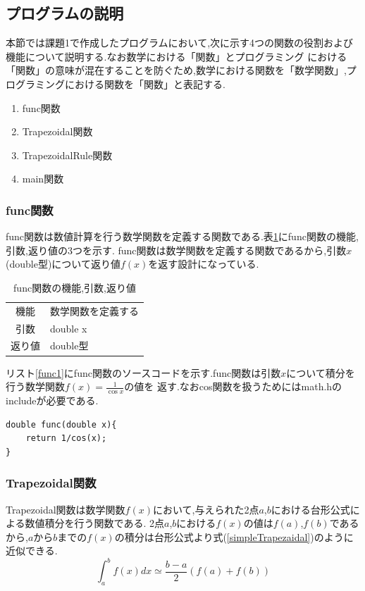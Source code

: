\documentclass[dvipdfmx]{jarticle}
\begin{document}
    \subsection{プログラムの説明}
    本節では課題1で作成したプログラムにおいて,次に示す4つの関数の役割および機能について説明する.なお数学における「関数」とプログラミング
    における「関数」の意味が混在することを防ぐため,数学における関数を「数学関数」,プログラミングにおける関数を「関数」と表記する.
    \begin{enumerate}
      \item func関数
      \item Trapezoidal関数
      \item TrapezoidalRule関数
      \item main関数
      \end{enumerate}
    
    \subsubsection{func関数}
    func関数は数値計算を行う数学関数を定義する関数である.表\ref{func1table}にfunc関数の機能,引数,返り値の3つを示す.
    func関数は数学関数を定義する関数であるから,引数$x$(double型)について返り値$f(x)$を返す設計になっている.
      \begin{table}[H]
      \caption{func関数の機能,引数,返り値}
      \label{func1table}
      \begin{center}
          \begin{tabular}{c|l}\hline
        機能 & 数学関数を定義する\\
        引数 & double x \\
        返り値 & double型 \\ \hline
          \end{tabular}
      \end{center}
      \end{table}

    リスト\ref{func1}にfunc関数のソースコードを示す.func関数は引数$x$について積分を行う数学関数$f(x) = \frac{1}{\cos x}$の値を
    返す.なおcos関数を扱うためにはmath.hのincludeが必要である.
    \begin{lstlisting}[basicstyle=\ttfamily\footnotesize, frame=single,label=func1,caption=func関数]
double func(double x){
    return 1/cos(x);
} 
    \end{lstlisting}

    \subsubsection{Trapezoidal関数}
    Trapezoidal関数は数学関数$f(x)$において,与えられた2点$a$,$b$における台形公式による数値積分を行う関数である.
    2点$a$,$b$における$f(x)$の値は$f(a)$,$f(b)$であるから,$a$から$b$までの$f(x)$の積分は台形公式より式(\ref{simpleTrapezaidal})のように
    近似できる.
    \begin{equation}
      \int_a^b f(x) dx \simeq \frac{b-a}{2}(f(a)+f(b))
          \label{simpleTrapezaidal}
        \end{equation}
\end{document}
